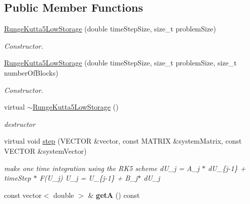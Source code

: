 \subsection*{Public Member Functions}
\begin{DoxyCompactItemize}
\item 
\hyperlink{classnatrium_1_1RungeKutta5LowStorage_add07295826ee6b9f5742ade3233f61b1}{Runge\-Kutta5\-Low\-Storage} (double time\-Step\-Size, size\-\_\-t problem\-Size)
\begin{DoxyCompactList}\small\item\em Constructor. \end{DoxyCompactList}\item 
\hyperlink{classnatrium_1_1RungeKutta5LowStorage_ad65bf4af8362a34f5530bb91bbec67fe}{Runge\-Kutta5\-Low\-Storage} (double time\-Step\-Size, size\-\_\-t problem\-Size, size\-\_\-t number\-Of\-Blocks)
\begin{DoxyCompactList}\small\item\em Constructor. \end{DoxyCompactList}\item 
\hypertarget{classnatrium_1_1RungeKutta5LowStorage_a915493da30cf9308bd47e87d0c20cad8}{virtual \hyperlink{classnatrium_1_1RungeKutta5LowStorage_a915493da30cf9308bd47e87d0c20cad8}{$\sim$\-Runge\-Kutta5\-Low\-Storage} ()}\label{classnatrium_1_1RungeKutta5LowStorage_a915493da30cf9308bd47e87d0c20cad8}

\begin{DoxyCompactList}\small\item\em destructor \end{DoxyCompactList}\item 
\hypertarget{classnatrium_1_1RungeKutta5LowStorage_a52b84da7a67cf85b9681e1b37c4e28df}{virtual void \hyperlink{classnatrium_1_1RungeKutta5LowStorage_a52b84da7a67cf85b9681e1b37c4e28df}{step} (V\-E\-C\-T\-O\-R \&vector, const M\-A\-T\-R\-I\-X \&system\-Matrix, const V\-E\-C\-T\-O\-R \&system\-Vector)}\label{classnatrium_1_1RungeKutta5LowStorage_a52b84da7a67cf85b9681e1b37c4e28df}

\begin{DoxyCompactList}\small\item\em make one time integration using the R\-K5 scheme d\-U\-\_\-j = A\-\_\-j $\ast$ d\-U\-\_\-\{j-\/1\} + time\-Step $\ast$ F(\-U\-\_\-j) U\-\_\-j = U\-\_\-\{j-\/1\} + B\-\_\-j$\ast$ d\-U\-\_\-j \end{DoxyCompactList}\item 
\hypertarget{classnatrium_1_1RungeKutta5LowStorage_a452fad5bef3b7734c94ca5796ce0c589}{const vector$<$ double $>$ \& {\bfseries get\-A} () const }\label{classnatrium_1_1RungeKutta5LowStorage_a452fad5bef3b7734c94ca5796ce0c589}


\end{DoxyCompactItemize}
